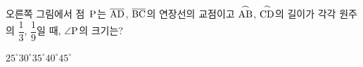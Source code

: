 \noindent\begin{minipage}[t]{0.58\linewidth}\vspace{0pt}\raggedright 오른쪽 그림에서 점~$\mathrm{P}$는 $\overline{\mathrm{AD}}$, $\overline{\mathrm{BC}}$의 연장선의 교점이고 $\overset{\frown}{\mathrm{AB}}$, $\overset{\frown}{\mathrm{CD}}$의 길이가 각각 원주의 $\dfrac{1}{3}$, $\dfrac{1}{9}$일 때, $\angle\mathrm{P}$의 크기는?\end{minipage}\hfill\begin{minipage}[t]{0.4\linewidth}\vspace{0pt}\centering \resizebox{\ifdim\width>\linewidth\linewidth\else\width\fi}{!}{}\end{minipage}\par
\begin{choices32}{$25^\circ$}{$30^\circ$}{$35^\circ$}{$40^\circ$}{$45^\circ$}\end{choices32}
